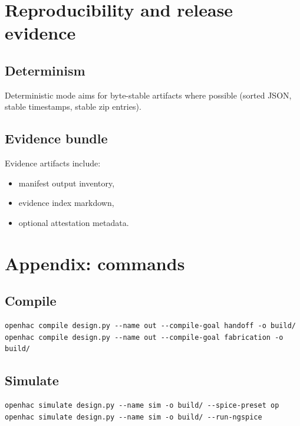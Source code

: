 \documentclass[11pt]{report}
\begin{document}
\chapter{Reproducibility and release evidence}

\section{Determinism}
Deterministic mode aims for byte-stable artifacts where possible (sorted JSON, stable timestamps, stable zip entries).

\section{Evidence bundle}
Evidence artifacts include:
\begin{itemize}
  \item manifest output inventory,
  \item evidence index markdown,
  \item optional attestation metadata.
\end{itemize}

\chapter{Appendix: commands}

\section{Compile}
\begin{lstlisting}[style=openhac]
openhac compile design.py --name out --compile-goal handoff -o build/
openhac compile design.py --name out --compile-goal fabrication -o build/
\end{lstlisting}

\section{Simulate}
\begin{lstlisting}[style=openhac]
openhac simulate design.py --name sim -o build/ --spice-preset op
openhac simulate design.py --name sim -o build/ --run-ngspice
\end{lstlisting}
\end{document}
